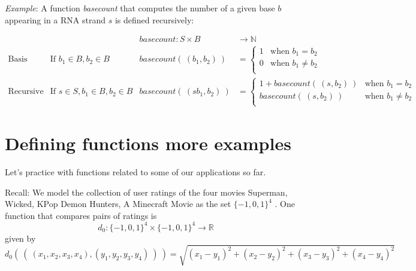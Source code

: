\documentclass[12pt, oneside]{article}
\newcommand{\A}[0]{\texttt{A}}
\newcommand{\C}[0]{\texttt{C}}
\newcommand{\G}[0]{\texttt{G}}
\newcommand{\U}[0]{\texttt{U}}
\begin{document}
\vfill

{\it Example}: A function \textit{basecount} that computes the number of a given base 
$b$ appearing in a RNA strand $s$ is defined recursively:
    
\[
\begin{array}{llll}
& & \textit{basecount} : S \times B & \to \mathbb{N} \\
\textrm{Basis Step:} &  \textrm{If } b_1 \in B, b_2 \in B & \textit{basecount}(~(b_1, b_2)~) & =
        \begin{cases}
            1 & \textrm{when } b_1 = b_2 \\
            0 & \textrm{when } b_1 \neq b_2 \\
        \end{cases} \\
\textrm{Recursive Step:} & \textrm{If } s \in S, b_1 \in B, b_2 \in B &\textit{basecount}(~(s b_1, b_2)~) & =
        \begin{cases}
            1 + \textit{basecount}(~(s, b_2)~) & \textrm{when } b_1 = b_2 \\
            \textit{basecount}(~(s, b_2)~) & \textrm{when } b_1 \neq b_2 \\
        \end{cases}
\end{array}
\]

 \vfill
\section*{Defining functions more examples}


Let's practice with functions related to some of our applications so far.

Recall: We model the collection of user ratings of the four movies Superman, Wicked, KPop Demon Hunters, A Minecraft Movie as the set
$\{-1,0,1\}^4$ . One function that compares pairs of ratings is
$$d_0: \{-1,0,1\}^4 \times \{-1,0,1\}^4 \to \mathbb{R}$$
given by
\[
d_0 (~(~ (x_1, x_2, x_3, x_4), (y_1, y_2, y_3, y_4) ~) ~) = \sqrt{ (x_1 - y_1)^2 + (x_2 - y_2)^2 + (x_3 -y_3)^2 + (x_4 -y_4)^2}
\]
\end{document}
